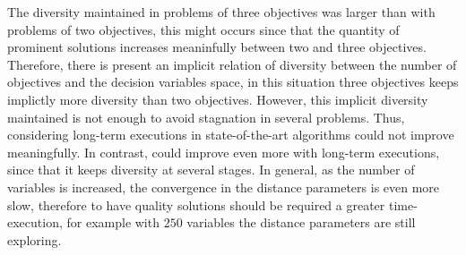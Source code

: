 The diversity maintained in problems of three objectives was larger than with problems of two objectives, this might occurs since that the quantity of prominent solutions increases meaninfully between two and three objectives.
%
Therefore, there is present an implicit relation of diversity between the number of objectives and the decision variables space, in this situation three objectives keeps implictly more diversity than two objectives.
%
However, this implicit diversity maintained is not enough to avoid stagnation in several problems.
%
Thus, considering long-term executions in state-of-the-art algorithms could not improve meaningfully.
%
In contrast, \VSDMOEA{} could improve even more with long-term executions, since that it keeps diversity at several stages.
%
In general, as the number of variables is increased, the convergence in the distance parameters is even more slow, therefore to have quality solutions should be required a greater time-execution, for example with $250$ variables the distance parameters are still exploring.
%

%
%
%
%
%
%
%
%
%
%


